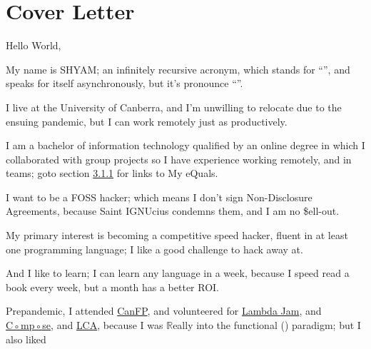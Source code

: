 \documentclass[12pt,a4paper,oneside]{article}
\newcommand{\sh}[1]{{\color{gray}{#1}}}
\begin{document}
\section{Cover Letter}
Hello World,
\medskip\\\par{}My name is SHYAM; an infinitely recursive acronym, which stands for ``\sh{SHYAM Has Your Anomaly Mitigated}'', and speaks for itself asynchronously, but it's pronounce ``\sh{Sharm}''.%
\par{}I live at the University of Canberra, and I'm unwilling to relocate due to the ensuing pandemic, but I can work remotely just as productively.
\par{}I am a bachelor of information technology qualified by an online degree in which I collaborated with group projects so I have experience working remotely, and in teams; goto section \hyperref[sec:bit]{3.1.1} for links to My eQuals.
\\\par{}I want to be a FOSS hacker; which means I don't sign Non-Disclosure Agreements, because Saint IGNUcius condemns them, and I am no \$ell-out.
\par{}My primary interest is becoming a competitive speed hacker, fluent in at least one programming language; I like a good challenge to hack away at.
\par{}And I like to learn; I can learn any language in a week, because I speed read a book every week, but a month has a better ROI.
\\\par{}Prepandemic, I attended \href{https://www.meetup.com/CanFPG/}{CanFP}, and volunteered for \href{http://lambdajam.yowconference.com.au/}{Lambda Jam}, and \href{http://www.composeconference.org/}{C◦mp◦se}, and \href{https://linux.conf.au/}{LCA}, because I was $\mathbb{R}$eally into the functional (\sh{Haskell}) paradigm; but I also liked
\end{document}
